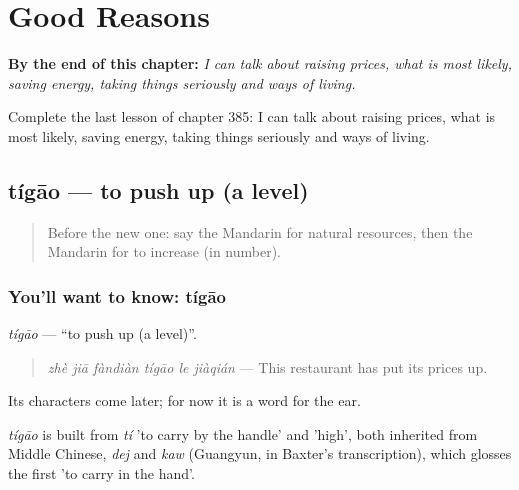 
\chapter{Good Reasons}
\label{ch:zh-good-reasons}

\begin{chapteropening}
\textbf{By the end of this chapter:} \emph{I can talk about raising prices, what is most likely, saving energy, taking things seriously and ways of living.}

Complete the last lesson of chapter 385: I can talk about raising prices, what is most likely, saving energy, taking things seriously and ways of living.
\end{chapteropening}

\section[tígāo]{tígāo — to push up (a level)}

\label{lesson:ZH-C385-tigao}



\begin{quote}
Before the new one: say the Mandarin for natural resources, then the Mandarin for to increase (in number).
\end{quote}

\subsection*{You'll want to know: tígāo}
\emph{tígāo} — \textquotedblleft{}to push up (a level)\textquotedblright{}.

\begin{quote}
\emph{zhè jiā fàndiàn tígāo le jiàqián} — This restaurant has put its prices up.
\end{quote}

Its characters come later; for now it is a word for the ear.

\begin{cousinweb}
\emph{tígāo} is built from \emph{tí} 'to carry by the handle' and  'high', both inherited from Middle Chinese, \emph{dej} and \emph{kaw} (Guangyun, in Baxter's transcription), which glosses the first 'to carry in the hand'.
\end{cousinweb}

